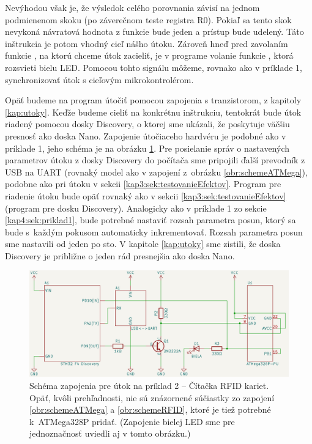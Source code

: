 Nevýhodou však je, že výsledok celého porovnania závisí na jednom podmienenom skoku (po záverečnom teste registra R0). Pokiaľ sa tento skok nevykoná návratová hodnota z funkcie bude jeden a prístup bude udelený. Táto inštrukcia je potom vhodný cieľ nášho útoku. Zároveň hneď pred zavolaním funkcie , na ktorú chceme útok zacieliť, je v programe volanie funkcie , ktorá rozsvieti bielu LED. Pomocou tohto signálu môžeme, rovnako ako v príklade 1, synchronizovať útok s cieľovým mikrokontrolérom.

Opäť budeme na program útočiť pomocou zapojenia s tranzistorom, z kapitoly \ref{kap:utoky}. Keďže budeme cieliť na konkrétnu inštrukciu, tentokrát bude útok riadený pomocou dosky Discovery, o ktorej sme ukázali, že poskytuje väčšiu presnosť ako doska Nano. Zapojenie útočiaceho hardvéru je podobné ako v príklade 1, jeho schéma je na obrázku \ref{obr:schemeCTF-RFID}. Pre posielanie správ o nastavených parametrov útoku z dosky Discovery do počítača sme pripojili ďalší prevodník z USB na UART (rovnaký model ako v zapojení z~obrázku \ref{obr:schemeATMega}), podobne ako pri útoku v sekcii \ref{kap3:sek:testovanieEfektov}. Program pre riadenie útoku bude opäť rovnaký ako v sekcii \ref{kap3:sek:testovanieEfektov} (program pre dosku Discovery). Analogicky ako v príklade 1 zo sekcie \ref{kap4:sek:priklad1}, bude potrebné nastaviť rozsah parametra posun, ktorý sa bude s~každým pokusom automaticky inkrementovať. Rozsah parametra posun sme nastavili od jeden po sto. V kapitole \ref{kap:utoky} sme zistili, že doska Discovery je približne o jeden rád presnejšia ako doska Nano.

\begin{figure}
    \centerline{\includegraphics[width=1\textwidth]{images/schemeCTF-RFID.png}}
    \caption[Schéma zapojenia pre útok na príklad 2]{Schéma zapojenia pre útok na príklad 2 -- Čítačka RFID kariet. Opäť, kvôli prehľadnosti, nie sú znázornené súčiastky zo zapojení \ref{obr:schemeATMega} a \ref{obr:schemeRFID}, ktoré je tiež potrebné k~ATMega328P pridať. (Zapojenie bielej LED sme pre jednoznačnosť uviedli aj v tomto obrázku.)}
    \label{obr:schemeCTF-RFID}
\end{figure}

